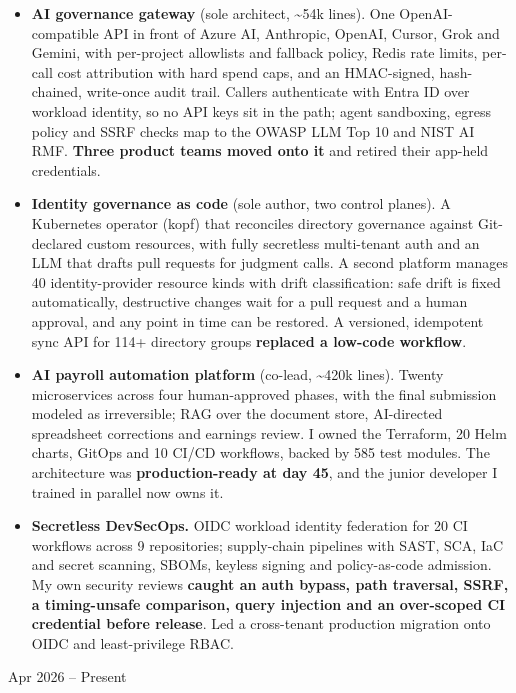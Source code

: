 \documentclass[10pt,letterpaper]{article}
\newcommand{\szmeta}{\fontsize{8pt}{10pt}\selectfont}
\begin{document}
\begin{itemize}
\item \textbf{AI governance gateway} {\color{muted}(sole architect, \textasciitilde{}54k lines)}. One OpenAI-compatible API in front of Azure AI, Anthropic, OpenAI, Cursor, Grok and Gemini, with per-project allowlists and fallback policy, Redis rate limits, per-call cost attribution with hard spend caps, and an HMAC-signed, hash-chained, write-once audit trail. Callers authenticate with Entra ID over workload identity, so no API keys sit in the path; agent sandboxing, egress policy and SSRF checks map to the OWASP LLM Top 10 and NIST AI RMF. \textbf{Three product teams moved onto it} and retired their app-held credentials.
\item \textbf{Identity governance as code} {\color{muted}(sole author, two control planes)}. A Kubernetes operator (kopf) that reconciles directory governance against Git-declared custom resources, with fully secretless multi-tenant auth and an LLM that drafts pull requests for judgment calls. A second platform manages 40 identity-provider resource kinds with drift classification: safe drift is fixed automatically, destructive changes wait for a pull request and a human approval, and any point in time can be restored. A versioned, idempotent sync API for 114+ directory groups \textbf{replaced a low-code workflow}.
\item \textbf{AI payroll automation platform} {\color{muted}(co-lead, \textasciitilde{}420k lines)}. Twenty microservices across four human-approved phases, with the final submission modeled as irreversible; RAG over the document store, AI-directed spreadsheet corrections and earnings review. I owned the Terraform, 20 Helm charts, GitOps and 10 CI/CD workflows, backed by 585 test modules. The architecture was \textbf{production-ready at day 45}, and the junior developer I trained in parallel now owns it.
\item \textbf{Secretless DevSecOps.} OIDC workload identity federation for 20 CI workflows across 9 repositories; supply-chain pipelines with SAST, SCA, IaC and secret scanning, SBOMs, keyless signing and policy-as-code admission. My own security reviews \textbf{caught an auth bypass, path traversal, SSRF, a timing-unsafe comparison, query injection and an over-scoped CI credential before release}. Led a cross-tenant production migration onto OIDC and least-privilege RBAC.
\end{itemize}
\vspace{3pt}
 \hfill {\color{muted}\szmeta Apr 2026 – Present}\\[1pt]
\end{document}
